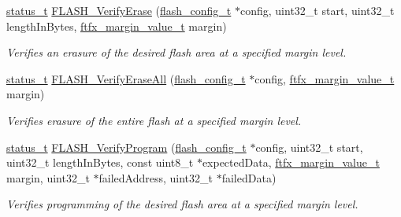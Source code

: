 \begin{DoxyCompactItemize}
\item 
\mbox{\hyperlink{group__ksdk__common_gaaabdaf7ee58ca7269bd4bf24efcde092}{status\+\_\+t}} \mbox{\hyperlink{group__ftfx__flash__driver_ga058e9dff5e5844fa184277915810ba9f}{F\+L\+A\+S\+H\+\_\+\+Verify\+Erase}} (\mbox{\hyperlink{group__ftfx__flash__driver_ga0dfc969e6f9e17c17e60d823565141a5}{flash\+\_\+config\+\_\+t}} $\ast$config, uint32\+\_\+t start, uint32\+\_\+t length\+In\+Bytes, \mbox{\hyperlink{group__ftfx__controller_ga2cef5154a854c303445b4bd5139f6392}{ftfx\+\_\+margin\+\_\+value\+\_\+t}} margin)
\begin{DoxyCompactList}\small\item\em Verifies an erasure of the desired flash area at a specified margin level. \end{DoxyCompactList}\item 
\mbox{\hyperlink{group__ksdk__common_gaaabdaf7ee58ca7269bd4bf24efcde092}{status\+\_\+t}} \mbox{\hyperlink{group__ftfx__flash__driver_ga32f44279dc39b3a0d5ac14a7b78efcbf}{F\+L\+A\+S\+H\+\_\+\+Verify\+Erase\+All}} (\mbox{\hyperlink{group__ftfx__flash__driver_ga0dfc969e6f9e17c17e60d823565141a5}{flash\+\_\+config\+\_\+t}} $\ast$config, \mbox{\hyperlink{group__ftfx__controller_ga2cef5154a854c303445b4bd5139f6392}{ftfx\+\_\+margin\+\_\+value\+\_\+t}} margin)
\begin{DoxyCompactList}\small\item\em Verifies erasure of the entire flash at a specified margin level. \end{DoxyCompactList}\item 
\mbox{\hyperlink{group__ksdk__common_gaaabdaf7ee58ca7269bd4bf24efcde092}{status\+\_\+t}} \mbox{\hyperlink{group__ftfx__flash__driver_ga32596ee9d9f6e26e4d9d6f609614335a}{F\+L\+A\+S\+H\+\_\+\+Verify\+Program}} (\mbox{\hyperlink{group__ftfx__flash__driver_ga0dfc969e6f9e17c17e60d823565141a5}{flash\+\_\+config\+\_\+t}} $\ast$config, uint32\+\_\+t start, uint32\+\_\+t length\+In\+Bytes, const uint8\+\_\+t $\ast$expected\+Data, \mbox{\hyperlink{group__ftfx__controller_ga2cef5154a854c303445b4bd5139f6392}{ftfx\+\_\+margin\+\_\+value\+\_\+t}} margin, uint32\+\_\+t $\ast$failed\+Address, uint32\+\_\+t $\ast$failed\+Data)
\begin{DoxyCompactList}\small\item\em Verifies programming of the desired flash area at a specified margin level. \end{DoxyCompactList}\end{DoxyCompactItemize}
